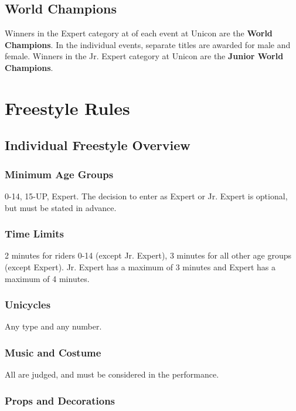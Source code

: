\section{World Champions \label{sec:freestyle_world-champions}}
Winners in the Expert category at of each event at Unicon are the \textbf{World Champions}.
In the individual events, separate titles are awarded for male and female.
Winners in the Jr. Expert category at Unicon are the \textbf{Junior World Champions}.

\chapter{Freestyle Rules}

\section{Individual Freestyle Overview}

\subsection{Minimum Age Groups}
 0-14, 15-UP, Expert.
The decision to enter as Expert or Jr. Expert is optional, but must be stated in advance.

\subsection{Time Limits}
2 minutes for riders 0-14 (except Jr. Expert), 3 minutes for all other age groups (except Expert).
Jr. Expert has a maximum of 3 minutes and Expert has a maximum of 4 minutes.

\subsection{Unicycles}
Any type and any number.

\subsection{Music and Costume}
All are judged, and must be considered in the performance.

\subsection{Props and Decorations \label{subsec:freestyle_freestyle-rules_individual-freestyle-overview_props-and-decorations}}

